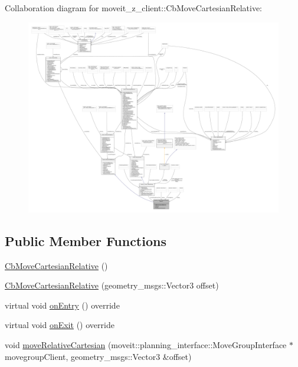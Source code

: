 Collaboration diagram for moveit\+\_\+z\+\_\+client\+:\+:Cb\+Move\+Cartesian\+Relative\+:
\nopagebreak
\begin{figure}[H]
\begin{center}
\leavevmode
\includegraphics[width=350pt]{classmoveit__z__client_1_1CbMoveCartesianRelative__coll__graph}
\end{center}
\end{figure}
\subsection*{Public Member Functions}
\begin{DoxyCompactItemize}
\item 
\hyperlink{classmoveit__z__client_1_1CbMoveCartesianRelative_a5c8cc24c13c1b440cd3ee7cdb26ec7e2}{Cb\+Move\+Cartesian\+Relative} ()
\item 
\hyperlink{classmoveit__z__client_1_1CbMoveCartesianRelative_a07c04dffa04c5cd30d46109ed2167932}{Cb\+Move\+Cartesian\+Relative} (geometry\+\_\+msgs\+::\+Vector3 offset)
\item 
virtual void \hyperlink{classmoveit__z__client_1_1CbMoveCartesianRelative_aaea0e6c7431f93301a77269b8fa539f8}{on\+Entry} () override
\item 
virtual void \hyperlink{classmoveit__z__client_1_1CbMoveCartesianRelative_a539af37d16cffdc51127c7a5206504cb}{on\+Exit} () override
\item 
void \hyperlink{classmoveit__z__client_1_1CbMoveCartesianRelative_aa8535a52826c36b103abebba6da7737f}{move\+Relative\+Cartesian} (moveit\+::planning\+\_\+interface\+::\+Move\+Group\+Interface $\ast$movegroup\+Client, geometry\+\_\+msgs\+::\+Vector3 \&offset)
\end{DoxyCompactItemize}
